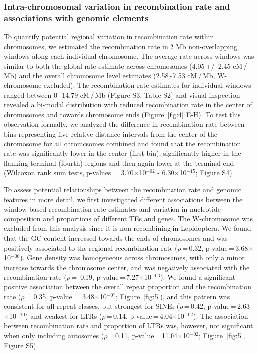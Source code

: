 \documentclass[twocolumn]{bmcart}%
\begin{document}
\subsubsection*{Intra-chromosomal variation in recombination rate and associations with genomic elements}

To quantify potential regional variation in recombination rate within chromosomes, we estimated the recombination rate in 2 Mb non-overlapping windows along each individual chromosome. The average rate across windows was similar to both the global rate estimate across chromosomes (4.05\,+/-\,2.45 cM\,/\,Mb) and the overall chromosome level estimates (2.58\,-\,7.53 cM\,/\,Mb, W-chromosome excluded). The recombination rate estimates for individual windows ranged between 0\,-\,14.79 cM\,/\,Mb (Figure S3, Table S2) and visual inspection revealed a bi-modal distribution with reduced recombination rate in the center of chromosomes and towards chromosome ends (Figure~\ref{fig:4} E-H). To test this observation formally, we analyzed the difference in recombination rate between bins representing five relative distance intervals from the center of the chromosome for all chromosomes combined and found that the recombination rate was significantly lower in the center (first bin), significantly higher in the flanking terminal (fourth) regions and then again lower at the terminal end (Wilcoxon rank sum tests, p-values = 3.70$\times$10$^{-02}$ - 6.30$\times$10$^{-15}$; Figure S4).

To assess potential relationships between the recombination rate and genomic features in more detail, we first investigated different associations between the window-based recombination rate estimates and variation in nucleotide composition and proportions of different TEs and genes. The W-chromosome was excluded from this analysis since it is non-recombining in Lepidoptera. We found that the GC-content increased towards the ends of chromosomes and was positively associated to the regional recombination rate ($\rho$\,=\,0.32, p-value\,=\,3.68$\times$10$^{-06}$). Gene density was homogeneous across chromosomes, with only a minor increase towards the chromosome center, and was negatively associated with the recombination rate ($\rho$\,=\,-0.19, p-value\,=\,7.27$\times$10$^{-03}$). We found a significant positive association between the overall repeat proportion and the recombination rate ($\rho$\,= 0.35, p-value \,=\,3.48$\times$10$^{-07}$; Figure~\ref{fig:5}), and this pattern was consistent for all repeat classes, but strongest for SINEs ($\rho$\,=\,0.42, p-value\,=\,2.63$\times$10$^{-10}$) and weakest for LTRs ($\rho$\,=\,0.14, p-value\,=\,4.04$\times$10$^{-02}$). The association between recombination rate and proportion of LTRs was, however, not significant when only including autosomes ($\rho$\,=\,0.11, p-value\,=\,11.04$\times$10$^{-02}$; Figure~\ref{fig:5}, Figure S5).
\end{document}
